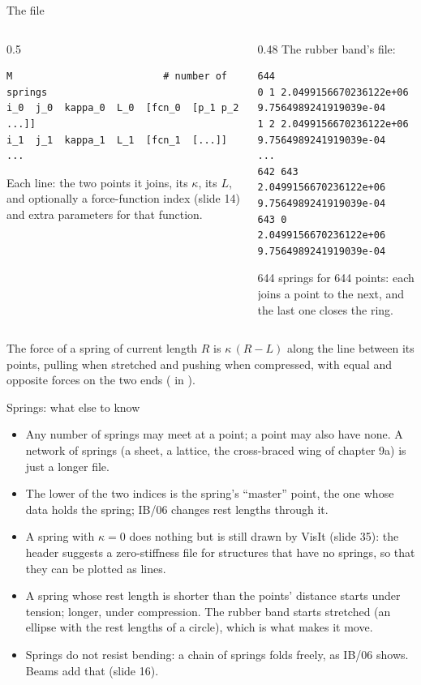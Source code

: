 \documentclass[aspectratio=169,11pt]{beamer}
\begin{document}
\begin{frame}[fragile]{The  file}
\begin{columns}[T,onlytextwidth]
\begin{column}{0.5\textwidth}
\begin{lstlisting}[style=data]
M                          # number of springs
i_0  j_0  kappa_0  L_0  [fcn_0  [p_1 p_2 ...]]
i_1  j_1  kappa_1  L_1  [fcn_1  [...]]
...
\end{lstlisting}
\small Each line: the two points it joins, its  $\kappa$, its  $L$, and optionally a force-function index (slide 14) and extra parameters for that function.
\end{column}
\begin{column}{0.48\textwidth}
\small The rubber band's file:
\begin{lstlisting}[style=tiny]
644
0 1 2.0499156670236122e+06 9.7564989241919039e-04
1 2 2.0499156670236122e+06 9.7564989241919039e-04
...
642 643 2.0499156670236122e+06 9.7564989241919039e-04
643 0 2.0499156670236122e+06 9.7564989241919039e-04
\end{lstlisting}
644 springs for 644 points: each joins a point to the next, and the last one closes the ring.
\end{column}
\end{columns}
\vspace{2mm}
\small The force of a spring of current length $R$ is $\kappa\,(R - L)$ along the line between its points, pulling when stretched and pushing when compressed, with equal and opposite forces on the two ends ( in ).
\end{frame}

\begin{frame}{Springs: what else to know}
\begin{itemize}
  \item Any number of springs may meet at a point; a point may also have none. A network of springs (a sheet, a lattice, the cross-braced wing of chapter 9a) is just a longer  file.
  \item The lower of the two indices is the spring's ``master'' point, the one whose data holds the spring; IB/06 changes rest lengths through it.
  \item A spring with $\kappa = 0$ does nothing but is still drawn by VisIt (slide 35): the header suggests a zero-stiffness  file for structures that have no springs, so that they can be plotted as lines.
  \item A spring whose rest length is shorter than the points' distance starts under tension; longer, under compression. The rubber band starts stretched (an ellipse with the rest lengths of a circle), which is what makes it move.
  \item Springs do not resist bending: a chain of springs folds freely, as IB/06 shows. Beams add that (slide 16).
\end{itemize}
\end{frame}
\end{document}

